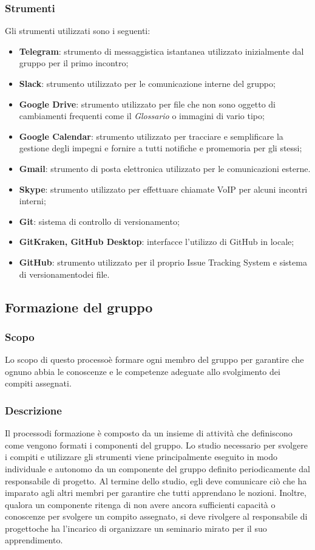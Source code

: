 		\subsubsection{Strumenti}
			Gli strumenti utilizzati sono i seguenti:
			\begin{itemize}
				\item \textbf{Telegram}: strumento di messaggistica istantanea utilizzato inizialmente dal gruppo per il primo incontro;
				\item \textbf{Slack}: strumento utilizzato per le comunicazione interne del gruppo;
				\item \textbf{Google Drive}: strumento utilizzato per file che non sono oggetto di cambiamenti frequenti come il \textit{Glossario} o immagini di vario tipo;
				\item \textbf{Google Calendar}: strumento utilizzato per tracciare e semplificare la gestione degli impegni e fornire a tutti notifiche e promemoria per gli stessi;
				\item \textbf{Gmail}: strumento di posta elettronica utilizzato per le comunicazioni esterne.
				\item \textbf{Skype}: strumento utilizzato per effettuare chiamate VoIP per alcuni incontri interni;
				\item \textbf{Git}: sistema di controllo di versionamento\glo;
				\item \textbf{GitKraken, GitHub Desktop}: interfacce l'utilizzo di GitHub in locale;
				\item \textbf{GitHub}: strumento utilizzato per il proprio Issue Tracking System e sistema di versionamento\glosp dei file.
			\end{itemize}
	\subsection{Formazione del gruppo}
		\subsubsection{Scopo}
			Lo scopo di questo processo\glosp è formare ogni membro del gruppo per garantire che ognuno abbia le conoscenze e le competenze adeguate allo svolgimento dei compiti assegnati.
		\subsubsection{Descrizione}
			Il processo\glosp di formazione è composto da un insieme di attività che definiscono come vengono formati i componenti del gruppo.
			Lo studio necessario per svolgere i compiti e utilizzare gli strumenti viene principalmente eseguito in modo individuale e autonomo da un componente del gruppo definito periodicamente dal responsabile di progetto\glo. Al termine dello studio, egli deve comunicare ciò che ha imparato agli altri membri per garantire che tutti apprendano le nozioni.
			Inoltre, qualora un componente ritenga di non avere ancora sufficienti capacità o conoscenze per svolgere un compito assegnato, si deve rivolgere al responsabile di progetto\glosp che ha l'incarico di organizzare un seminario mirato per il suo apprendimento.
			
